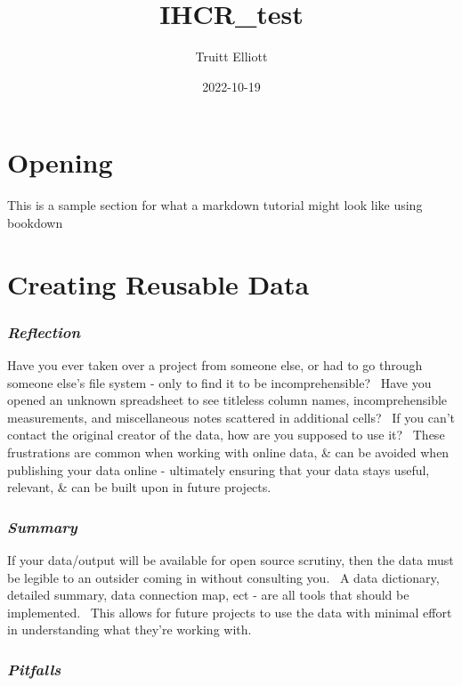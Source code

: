 \documentclass[
]{book}
\title{IHCR\_test}
\author{Truitt Elliott}
\date{2022-10-19}
\begin{document}
\maketitle

{
\setcounter{tocdepth}{1}
\tableofcontents
}
\hypertarget{opening}{%
\chapter{Opening}\label{opening}}

This is a sample section for what a markdown tutorial might look like using bookdown

\hypertarget{reusable}{%
\chapter{Creating Reusable Data}\label{reusable}}

\hypertarget{reflection}{%
\subsection{\texorpdfstring{\emph{Reflection}}{Reflection}}\label{reflection}}

Have you ever taken over a project from someone else, or had to go through someone else's file system - only to find it to be incomprehensible?~ Have you opened an unknown spreadsheet to see titleless column names, incomprehensible measurements, and miscellaneous notes scattered in additional cells?~ If you can't contact the original creator of the data, how are you supposed to use it?~ These frustrations are common when working with online data, \& can be avoided when publishing your data online - ultimately ensuring that your data stays useful, relevant, \& can be built upon in future projects.

\hypertarget{summary}{%
\subsection{\texorpdfstring{\emph{Summary}}{Summary}}\label{summary}}

If your data/output will be available for open source scrutiny, then the data must be legible to an outsider coming in without consulting you.~ A data dictionary, detailed summary, data connection map, ect - are all tools that should be implemented.~ This allows for future projects to use the data with minimal effort in understanding what they're working with.~~~

\hypertarget{pitfalls}{%
\subsection{\texorpdfstring{\emph{Pitfalls}}{Pitfalls}}\label{pitfalls}}
\end{document}
